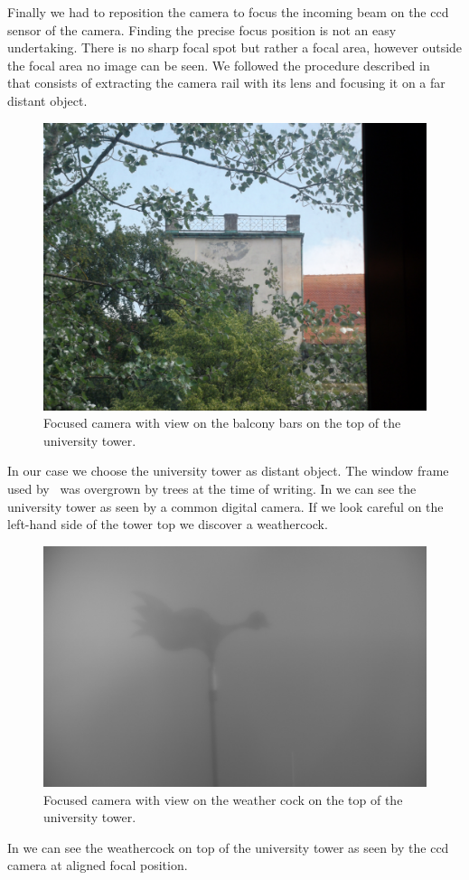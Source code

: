Finally we had to reposition the camera to focus the incoming beam on the
\gls{ccd} sensor of the camera. Finding the precise focus position is not an
easy undertaking. There is no sharp focal spot but rather a focal area,
however outside the focal area no image can be seen. We followed the procedure
described in~\cite{Hertlein2017} that consists of extracting the camera rail
with its lens and focusing it on a far distant object.
\begin{figure}[htb]
  \centering
  \includegraphics[width=\textwidth]{../media/image/tower.jpg}
  \caption{Focused camera with view on the balcony bars on the top of the
    university tower.
  }\label{fig:camerafocus:tower}
\end{figure}
In our case we choose the university tower as distant object. The window frame
used by~\cite{Hertlein2017} was overgrown by trees at the time of writing.
In  we can see the university tower as seen by
a common digital camera. If we look careful on the left-hand side of the
tower top we discover a weathercock.
\begin{figure}[htb]
  \centering
  \includegraphics[width=\textwidth]{../media/image/focus.jpg}
  \caption{Focused camera with view on the weather cock on the top of the
    university tower.
  }\label{fig:camerafocus:focus}
\end{figure}
In  we can see the weathercock on top of the
university tower as seen by the \gls{ccd} camera at aligned focal position.
